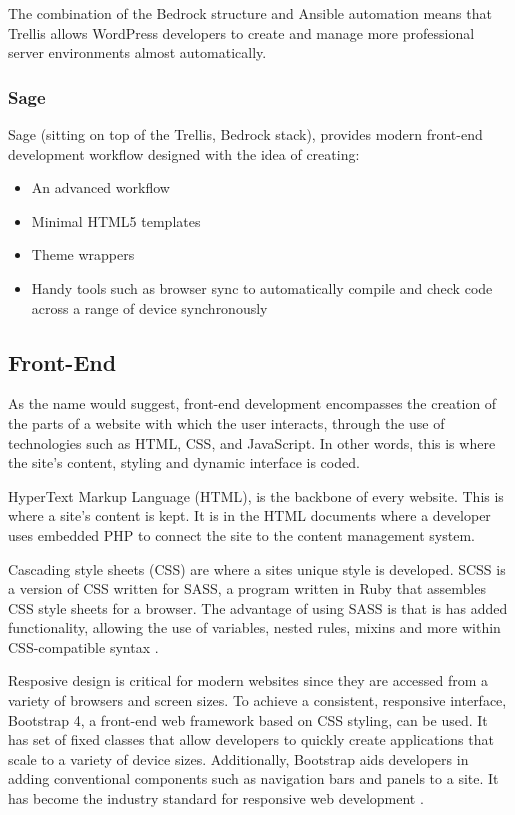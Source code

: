 \documentclass[fontsize=11pt]{extarticle}
\numberwithin{figure}{section} %
\numberwithin{table}{section}%
\providecommand{\tightlist}{%
  \setlength{\itemsep}{0pt}\setlength{\parskip}{0pt}}
\begin{document}
The combination of the Bedrock structure and Ansible automation means
that Trellis allows WordPress developers to create and manage more
professional server environments almost automatically.

\hypertarget{sage}{%
\subsubsection{Sage}\label{sage}}

Sage (sitting on top of the Trellis, Bedrock stack), provides modern
front-end development workflow designed with the idea of creating:

\begin{itemize}
\tightlist
\item
  An advanced workflow
\item
  Minimal HTML5 templates
\item
  Theme wrappers
\item
  Handy tools such as browser sync to automatically compile and check
  code across a range of device synchronously
\end{itemize}

\hypertarget{front-end}{%
\subsection{Front-End}\label{front-end}}

As the name would suggest, front-end development encompasses the
creation of the parts of a website with which the user interacts,
through the use of technologies such as HTML, CSS, and JavaScript. In
other words, this is where the site's content, styling and dynamic
interface is coded.

HyperText Markup Language (HTML), is the backbone of every website. This
is where a site's content is kept. It is in the HTML documents where a
developer uses embedded PHP to connect the site to the content
management system.

Cascading style sheets (CSS) are where a sites unique style is
developed. SCSS is a version of CSS written for SASS, a program written
in Ruby that assembles CSS style sheets for a browser. The advantage of
using SASS is that is has added functionality, allowing the use of
variables, nested rules, mixins and more within CSS-compatible syntax
\cite{p14}.

Resposive design is critical for modern websites since they are accessed
from a variety of browsers and screen sizes. To achieve a consistent,
responsive interface, Bootstrap 4, a front-end web framework based on
CSS styling, can be used. It has set of fixed classes that allow
developers to quickly create applications that scale to a variety of
device sizes. Additionally, Bootstrap aids developers in adding
conventional components such as navigation bars and panels to a site. It
has become the industry standard for responsive web development
\cite{p15}.
\end{document}
